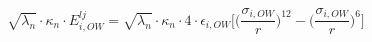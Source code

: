 \begin{center}
    \begin{equation}
        \sqrt{\lambda_n}\cdot\kappa_n\cdot E_{i,OW}^{lj} = \sqrt{\lambda_n}\cdot \kappa_n \cdot 4 \cdot\epsilon_{i,OW}\Big[ \Big( \frac{\sigma_{i,OW}}{r}\big)^{12} -  \Big( \frac{\sigma_{i,OW}}{r}\big)^{6} \Big]
    \label{eq:lj_potential}
    \end{equation}
\end{center}